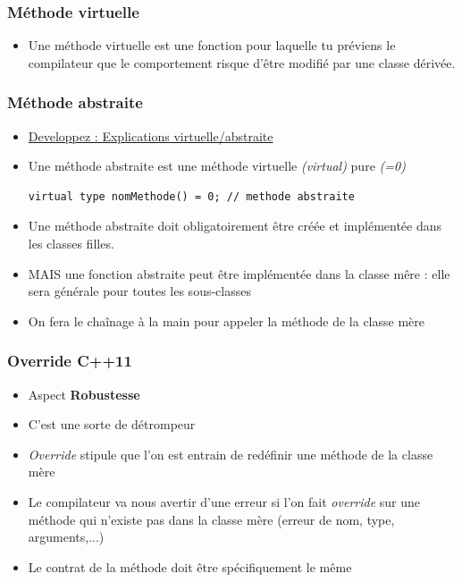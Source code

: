 \documentclass[12pt,a4paper]{article}
\begin{document}
\subsubsection{Méthode virtuelle}
\begin{itemize}
\item Une méthode virtuelle est une fonction pour laquelle tu préviens le compilateur que le comportement risque d'être modifié par une classe dérivée.
\end{itemize}
\subsubsection{Méthode abstraite }
\begin{itemize}
\item \href{https://www.developpez.net/forums/d740612/c-cpp/cpp/debuter/methode-virtuelle-abstraite/}{Developpez : Explications virtuelle/abstraite}
\item Une méthode abstraite est une méthode virtuelle \textit{(virtual)} pure \textit{(=0)}
\begin{lstlisting}
virtual type nomMethode() = 0; // methode abstraite
\end{lstlisting}
\item Une méthode abstraite doit obligatoirement être créée et implémentée dans les classes filles.
\item MAIS une fonction abstraite peut être implémentée dans la classe mêre : elle sera générale pour toutes les sous-classes
\item On fera le chaînage à la main pour appeler la méthode de la classe mère
\end{itemize}
\subsubsection{Override C++11}
\begin{itemize}
\item Aspect \textbf{Robustesse}
\item C'est une sorte de détrompeur
\item \textit{Override} stipule que l'on est entrain de redéfinir une méthode de la classe mère
\item Le compilateur va nous avertir d'une erreur si l'on fait \textit{override} sur une méthode qui n'existe pas dans la classe mère (erreur de nom, type, arguments,...)
\item Le contrat de la méthode doit être spécifiquement le même
\end{itemize}
\end{document}
